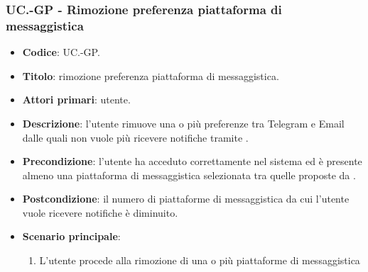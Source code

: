 	\subsubsection{UC\theuccount.\thesubuccount-GP - Rimozione preferenza piattaforma di messaggistica}

	\begin{itemize}
		\item \textbf{Codice}: UC\theuccount.\thesubuccount-GP.
		\item \textbf{Titolo}: rimozione preferenza piattaforma di messaggistica.
		\item \textbf{Attori primari}: utente.
		\item \textbf{Descrizione}: l’utente rimuove una o più preferenze tra Telegram e Email dalle	quali non vuole più ricevere notifiche tramite \progetto.
		\item \textbf{Precondizione}: l’utente ha acceduto correttamente nel sistema ed è presente almeno una piattaforma di messaggistica selezionata tra quelle proposte da \progetto.
		\item \textbf{Postcondizione}: il numero di piattaforme di messaggistica da cui l’utente vuole ricevere notifiche è diminuito.
		\item \textbf{Scenario principale}:
		\begin{enumerate}
			\item L'utente procede alla rimozione di una o più piattaforme di messaggistica
		\end{enumerate}
	\end{itemize}


